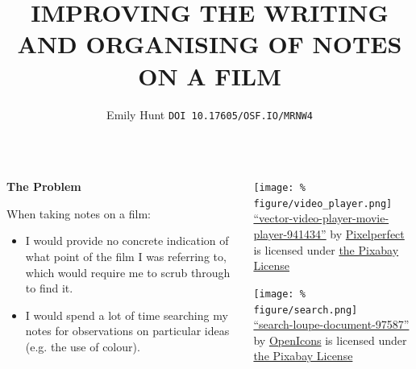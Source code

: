 \documentclass[unknownkeysallowed,usepdftitle=false, parskip=full]{beamer}
\title{IMPROVING THE WRITING AND ORGANISING OF NOTES ON A FILM}
\author{Emily Hunt \texttt{DOI 10.17605/OSF.IO/MRNW4}}
\newcommand{\secvariable}{nothing}
\newcommand{\mysection}[1]{\renewcommand{\secvariable}{#1}
}
\begin{document}
\mysection{abstract}
\begin{frame}\label{\secvariable}

 \begin{columns}[t]
  
      \begin{column}[c]{0.45\textwidth}
    \parbox{\linewidth}{
    
    \textbf{The Problem}

\vspace{1pt}

      When taking notes on a film:  
      
      \vspace{1pt}
      
      \begin{itemize}
          \item I would provide no concrete indication of what point of the film I was referring to, which would require me to scrub through to find it.
      \end{itemize}
      \begin{itemize}
          \item I would spend a lot of time searching my notes for observations on particular ideas (e.g. the use of colour).
      \end{itemize}
      }
    \end{column}
  
  \begin{column}[c]{0.45\textwidth}
  \begin{center}
\texttt{[image: \%
figure/video\_player.png]}\\
\tiny{\href{https://pixabay.com/illustrations/vector-video-player-movie-player-941434/}{“vector-video-player-movie-player-941434”} by \href{https://pixabay.com/users/pixel_perfect-1411206/}{Pixel\textunderscore perfect} is licensed under \href{https://pixabay.com/service/terms/}{the Pixabay License}}

\vspace{2pt}
\texttt{[image: \%
figure/search.png]}\\
\tiny{\href{https://pixabay.com/vectors/search-loupe-document-97587/}{“search-loupe-document-97587”} by \href{https://pixabay.com/users/openicons-28911/}{OpenIcons} is licensed under \href{https://pixabay.com/service/terms/}{the Pixabay License}
}
\end{center}
    \end{column}
\end{columns}
  
\end{frame}
\end{document}
